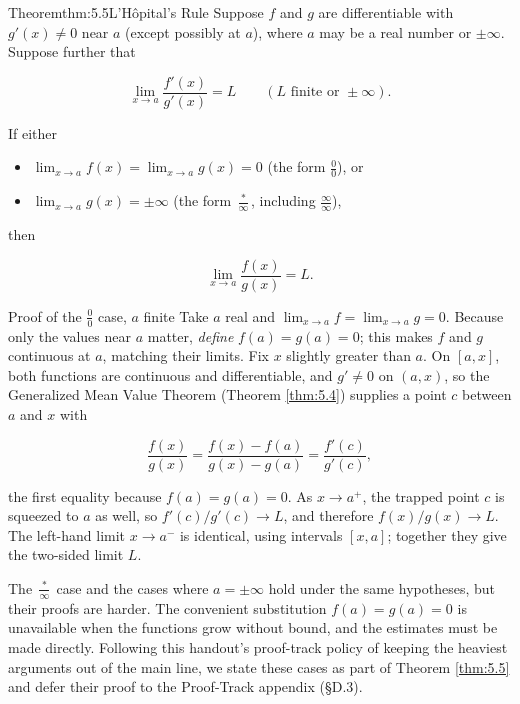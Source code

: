 \documentclass[a4paper,12pt,oneside]{memoir}
\begin{document}
\begin{envtheorem}{Theorem}{thm:5.5}{L’Hôpital’s Rule}
Suppose \(f\) and \(g\) are differentiable with \(g'(x) \ne 0\) near \(a\) (except possibly at \(a\)), where \(a\) may be a real number or \(\pm\infty\). Suppose further that

\[ \lim_{x \to a} \frac{f'(x)}{g'(x)} = L \qquad (L \text{ finite or } \pm\infty). \]

If either

\begin{itemize}
  \item \(\displaystyle \lim_{x \to a} f(x) = \lim_{x \to a} g(x) = 0\) (the form \(\tfrac{0}{0}\)), or
  \item \(\displaystyle \lim_{x \to a} g(x) = \pm\infty\) (the form \(\tfrac{\ast}{\infty}\), including \(\tfrac{\infty}{\infty}\)),
\end{itemize}
then

\[ \lim_{x \to a} \frac{f(x)}{g(x)} = L. \]
\end{envtheorem}
\begin{envproof}{Proof of the \(\tfrac{0}{0}\) case, \(a\) finite}{}{}
Take \(a\) real and \(\lim_{x \to a} f = \lim_{x \to a} g = 0\). Because only the values near \(a\) matter, \emph{define} \(f(a) = g(a) = 0\); this makes \(f\) and \(g\) continuous at \(a\), matching their limits. Fix \(x\) slightly greater than \(a\). On \([a, x]\), both functions are continuous and differentiable, and \(g' \ne 0\) on \((a, x)\), so the Generalized Mean Value Theorem (Theorem \ref{thm:5.4}) supplies a point \(c\) between \(a\) and \(x\) with

\[ \frac{f(x)}{g(x)} = \frac{f(x) - f(a)}{g(x) - g(a)} = \frac{f'(c)}{g'(c)}, \]

the first equality because \(f(a) = g(a) = 0\). As \(x \to a^{+}\), the trapped point \(c\) is squeezed to \(a\) as well, so \(f'(c)/g'(c) \to L\), and therefore \(f(x)/g(x) \to L\). The left-hand limit \(x \to a^{-}\) is identical, using intervals \([x, a]\); together they give the two-sided limit \(L\). \qedmark
\end{envproof}
The \(\tfrac{\ast}{\infty}\) case and the cases where \(a = \pm\infty\) hold under the same hypotheses, but their proofs are harder. The convenient substitution \(f(a) = g(a) = 0\) is unavailable when the functions grow without bound, and the estimates must be made directly. Following this handout’s proof-track policy of keeping the heaviest arguments out of the main line, we state these cases as part of Theorem \ref{thm:5.5} and defer their proof to the Proof-Track appendix (§D.3).
\end{document}
